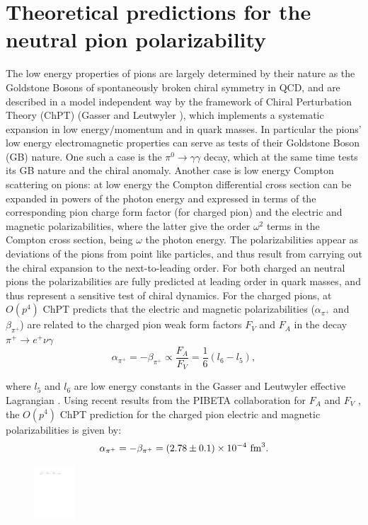 \section{Theoretical predictions for the neutral pion polarizability}
The low energy properties of pions are largely determined by  their nature as
the Goldstone Bosons of spontaneously broken chiral symmetry in QCD,
and are described in a model independent way by the framework of
Chiral Perturbation Theory (ChPT) (Gasser and Leutwyler
\cite{Gasser:1983yg}), which implements a systematic expansion in low
energy/momentum and in quark masses.  In particular the pions' low
energy electromagnetic properties can serve as tests of their
Goldstone Boson (GB) nature. One such a case is the $\pi^0\to
\gamma\gamma$ decay, which at the same time tests its GB nature and
the chiral anomaly. Another case is low energy Compton scattering on
pions: at low energy the Compton differential cross section can be
expanded in powers of the photon energy and expressed in terms of the
corresponding pion charge form factor (for charged pion) and the electric and magnetic
polarizabilities, where the latter give the order $\omega^2$ terms in
the Compton cross section, being $\omega$ the photon energy. The polarizabilities appear as deviations
of the pions from point like particles, and thus result from carrying
out the chiral expansion to the next-to-leading order. For both
charged an neutral pions the polarizabilities are fully predicted at
leading order in quark masses, and thus represent a sensitive test of
chiral dynamics. For the charged pions, at $O(p^4)$ ChPT predicts that
the electric and magnetic polarizabilities ($\alpha_{\pi^+}$ and
$\beta_{\pi^+}$) are related to the charged pion weak form factors
$F_V$ and $F_A$ in the decay $\pi^+ \rightarrow e^+ \nu \gamma$
\begin{equation}\label{alpha_and_beta}
\alpha_{\pi^+} = -\beta_{\pi^+} \propto \frac{F_A}{F_V} = \frac{1}{6} ( l_6 - l_5 ),
\end{equation}

\noindent where $l_5$ and $l_6$ are low energy constants in the Gasser
and Leutwyler effective Lagrangian \cite{Gasser:1983yg}.  Using recent
results from the PIBETA collaboration for $F_A$ and $F_V$
\cite{Bychkov:2008ws}, the $O(p^4)$ ChPT prediction for the charged
pion electric and magnetic polarizabilities is given by:
\begin{equation}\label{one_loop}
\alpha_{\pi^+} = -\beta_{\pi^+} = (2.78 \pm 0.1) \times 10^{-4}~{\rm fm}^3.
\end{equation}
\begin{figure}[h]
\begin{center}
\includegraphics[height=2cm,angle=0]{figures/Fig-TP-1.pdf}
\end{center}
\caption{
\label{fig:digrams}}
\end{figure}


